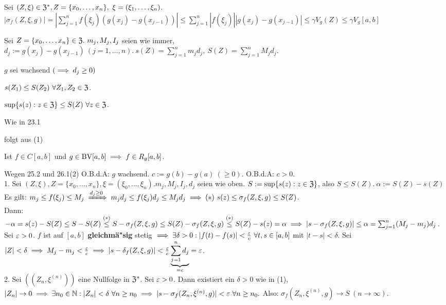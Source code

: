 \documentclass[a4paper,oneside,DIV15,BCOR12mm]{scrbook}
\begin{document}
\begin{beweis}
Sei $(Z, \xi) \in \mathfrak{Z}^*, Z = \{x_0,\ldots,x_n\},\ \xi = (\xi_1,\ldots,\xi_n)$.\\
$|\sigma_f(Z,\xi, g)|=|\displaystyle\sum_{j=1}^nf(\xi_j)(g(x_j)-g(x_{j-1}))|\le\displaystyle\sum_{j=1}^n|f(\xi_j)||g(x_j)-g(x_{j-1})|\le\gamma V_g(Z)\le\gamma V_g[a, b]$ 
\end{beweis}

\begin{bezeichnungen}
Sei $Z=\{x_0, \ldots, x_n\} \in \mathfrak{Z}.\ m_j, M_j, I_j$ seien wie immer, $d_j:=g(x_j)-g(x_{j-1})\ (j=1,\ldots,n).\ s(Z)=\sum_{j=1}^nm_jd_j,\ S(Z)=\sum_{j=1}^nM_jd_j$.
\end{bezeichnungen}

\begin{wichtigerhilfssatz}
$g$ sei wachsend $(\implies d_j \ge 0)$
\begin{liste}
\item $s(Z_1)\le S(Z_2)\ \forall Z_1, Z_2 \in \mathfrak{Z}$.
\item $\sup \{s(z) : z \in \mathfrak{Z}\}\le S(Z)\ \forall z \in \mathfrak{Z}$.
\end{liste}
\end{wichtigerhilfssatz}

\begin{beweise}
\item Wie in 23.1
\item folgt aus (1)
\end{beweise}

\begin{satz}
Ist $f\in C[a,b]$ und $g \in \text{BV}[a,b]\implies f \in R_g[a,b]$.
\end{satz}

\begin{beweis}
Wegen 25.2 und 26.1(2) O.B.d.A: $g$ wachsend. $c:=g(b)-g(a)\ (\ge 0).$ O.B.d.A: $c>0$.\\
1. Sei $(Z, \xi), Z=\{x_0, \ldots, x_n\}, \xi=(\xi_0, \ldots, \xi_n). m_j, M_j, I_j, d_j$ seien wie oben. $S:=\sup\{s(z): z \in \mathfrak{Z}\}$, also $S\le S(Z).\ \alpha:=S(Z)-s(Z)$\\
Es gilt: $m_j\le f(\xi_j) \le M_j \folgtwegen{d_j \ge 0} m_jd_j \le f(\xi_j)d_j\le M_jd_j\folgt (*)\ s(z)\le \sigma_f(Z,\xi,g)\le S(Z)$.\\
Dann: $-\alpha=s(z)-S(Z)\le S-S(Z)\overset{(*)}{\le}S-\sigma_f(Z,\xi,g)\le S(Z)-\sigma_f(Z,\xi,g)\overset{(*)}{\le}S(Z)-s(z)=\alpha\implies |s-\sigma_f(Z,\xi,g)|\le \alpha = \sum_{j=1}^n(M_j-m_j)d_j$.\\
Sei $\varepsilon>0$. $f$ ist auf $[a,b]$ \textbf{gleichmä"sig} stetig $\implies \exists\delta>0: |f(t)-f(s)|<\frac{\varepsilon}{c}\ \forall t,s \in [a,b]$ mit $|t-s|<\delta$. Sei $|Z|<\delta\implies M_j-m_j<\frac{\varepsilon}{c}\implies|s-\delta_f(Z,\xi, g)|<\frac{\varepsilon}{c}\underbrace{\sum_{j=1}^nd_j}_{=c}=\varepsilon$. \\
2. Sei $((Z_n, \xi^{(n)}))$ eine Nullfolge in $\mathfrak{Z}^*$. Sei $\varepsilon>0$. Dann existiert ein $\delta>0$ wie in (1), $|Z_n|\to 0 \implies \exists n_0 \in \mathbb{N}: |Z_n|<\delta\ \forall n\ge n_0 \implies |s-\sigma_f(Z_n, \xi^{(n)}, g)|<\varepsilon \ \forall n\ge n_0. $ Also: $\sigma_f(Z_n, \xi^{(n)}, g) \to S\ (n\to\infty)$.
\end{beweis}
\end{document}
